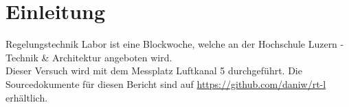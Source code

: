 \section*{Einleitung}
Regelungstechnik Labor ist eine Blockwoche, welche an der Hochschule Luzern - 
Technik \& Architektur angeboten wird. \\
Dieser Versuch wird mit dem Messplatz Luftkanal 5 durchgeführt. 
Die Sourcedokumente für diesen Bericht sind auf \url{https://github.com/daniw/rt-l}
erhältlich. 
